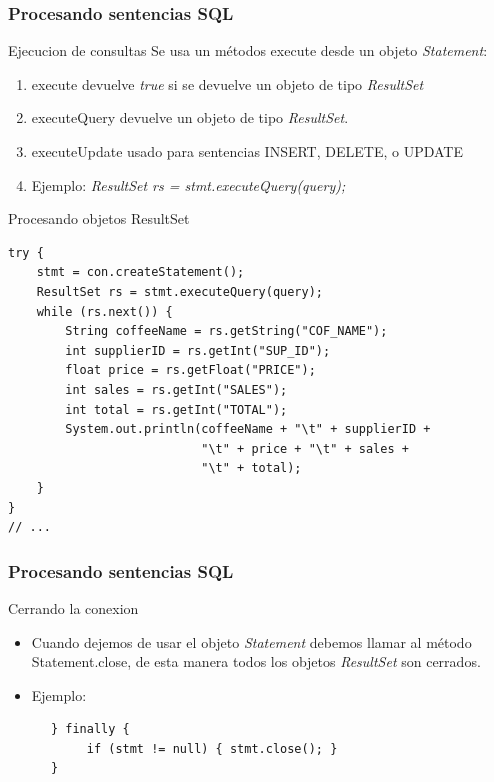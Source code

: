 \documentclass{beamer}
\begin{document}
\begin{frame}[fragile]
\frametitle{Procesando sentencias SQL} 
\begin{tiny}
\begin{block}{Ejecucion de consultas}
Se usa un métodos \alert{execute} desde un objeto \emph{Statement}:
\begin{enumerate}[<+->]
\item \alert{execute} devuelve \emph{true} si se devuelve un objeto de tipo \emph{ResultSet}
\item \alert{executeQuery} devuelve un objeto de tipo \emph{ResultSet}.
\item \alert{executeUpdate} usado para sentencias INSERT, DELETE, o UPDATE
\item Ejemplo: \emph{ResultSet rs = stmt.executeQuery(query);}
\end{enumerate}
\end{block} 
\pause
\begin{block}{Procesando objetos ResultSet}
\begin{verbatim}
try {
    stmt = con.createStatement();
    ResultSet rs = stmt.executeQuery(query);
    while (rs.next()) {
        String coffeeName = rs.getString("COF_NAME");
        int supplierID = rs.getInt("SUP_ID");
        float price = rs.getFloat("PRICE");
        int sales = rs.getInt("SALES");
        int total = rs.getInt("TOTAL");
        System.out.println(coffeeName + "\t" + supplierID +
                           "\t" + price + "\t" + sales +
                           "\t" + total);
    }
}
// ...
\end{verbatim}
\end{block}
\end{tiny}
\end{frame}


\begin{frame}[fragile]
\frametitle{Procesando sentencias SQL} 
\begin{block}{Cerrando la conexion}
\begin{itemize}[<+->]
\item Cuando dejemos de usar el objeto \emph{Statement} debemos llamar al método \alert{Statement.close}, de esta manera todos los objetos \emph{ResultSet} son cerrados.
\item Ejemplo:
\end{itemize}
\pause
\begin{verbatim}
      } finally {
           if (stmt != null) { stmt.close(); }
      }
\end{verbatim}
\end{block}
\end{frame}
\end{document}
